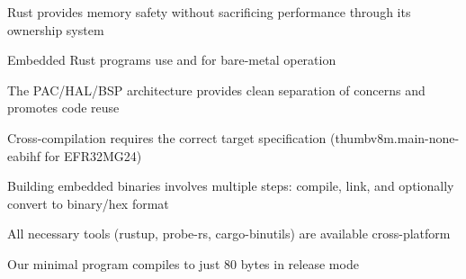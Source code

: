 









\clearpage


\begin{keytakeaways}
    \item Rust provides memory safety without sacrificing performance through its ownership system
    \item Embedded Rust programs use  and  for bare-metal operation
    \item The PAC/HAL/BSP architecture provides clean separation of concerns and promotes code reuse
    \item Cross-compilation requires the correct target specification (thumbv8m.main-none-eabihf for EFR32MG24)
    \item Building embedded binaries involves multiple steps: compile, link, and optionally convert to binary/hex format
    \item All necessary tools (rustup, probe-rs, cargo-binutils) are available cross-platform
    \item Our minimal program compiles to just 80 bytes in release mode
\end{keytakeaways}

